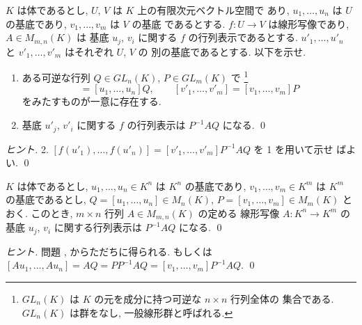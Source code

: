 \documentclass[12pt,twoside]{jarticle}
\begin{document}
\begin{question}[基底の変換, 5点]
  \label{q:P^{-1}AQ}
  $K$ は体であるとし, $U$, $V$ は $K$ 上の有限次元ベクトル空間で
  あり, $u_1,\ldots,u_n$ は $U$ の基底であり, $v_1,\ldots,v_m$ は $V$ の基底
  であるとする.  $f:U\to V$ は線形写像であり, $A\in M_{m,n}(K)$ は
  基底 $u_j$, $v_i$ に関する $f$ の行列表示であるとする.
  $u'_1,\ldots,u'_n$ と $v'_1,\ldots,v'_m$ はそれぞれ $U$, $V$ の
  別の基底であるとする.  以下を示せ.
  \begin{enumerate}
  \item ある可逆な行列 $Q\in GL_n(K)$, $P\in GL_m(K)$ で%
    \footnote{$GL_n(K)$ は $K$ の元を成分に持つ可逆な $n\times n$ 行列全体の
      集合である.  $GL_n(K)$ は群をなし, 一般線形群と呼ばれる.}
    \begin{equation*}
      [u'_1,\ldots,u'_n]=[u_1,\ldots,u_n]Q,
      \qquad
      [v'_1,\ldots,v'_m] = [v_1,\ldots,v_m]P
    \end{equation*}
    をみたすものが一意に存在する.
  \item 基底 $u'_j$, $v'_i$ に関する $f$ の行列表示は $P^{-1}AQ$ になる.
    \qed
  \end{enumerate}
\end{question}

\begin{proof}[ヒント]
  2. $[f(u'_1),\ldots,f(u'_n)]=[v'_1,\ldots,v'_m]P^{-1}AQ$ を 1 を用いて示せ
  ばよい. \qed
\end{proof}


\begin{question}[5点]
  $K$ は体であるとし, 
  $u_1,\ldots,u_n\in K^n$ は $K^n$ の基底であり, 
  $v_1,\ldots,v_m\in K^m$ は $K^m$ の基底であるとし,
  $Q=[u_1,\ldots,u_n]\in M_n(K)$, $P=[v_1,\ldots,v_m]\in M_m(K)$ とおく.
  このとき, $m\times n$ 行列 $A\in M_{m,n}(K)$ の定める
  線形写像 $A:K^n\to K^m$ の
  基底 $u_j$, $v_i$ に関する行列表示は $P^{-1}AQ$ になる.
  \qed
\end{question}

\begin{proof}[ヒント]
  問題 ,  からただちに得られる.
  もしくは $[Au_1,\ldots,Au_n]=AQ=PP^{-1}AQ=[v_1,\ldots,v_m]P^{-1}AQ$. 
  \qed
\end{proof}

\end{document}
